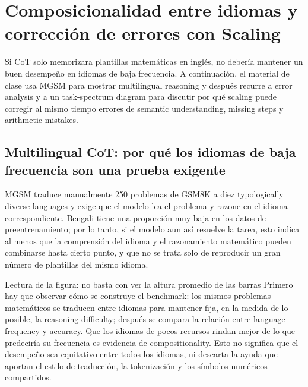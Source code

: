 \section{Composicionalidad entre idiomas y corrección de errores con Scaling}

Si CoT solo memorizara plantillas matemáticas en inglés, no debería mantener un buen desempeño en idiomas de baja frecuencia. A continuación, el material de clase usa MGSM para mostrar multilingual reasoning y después recurre a error analysis y a un task-spectrum diagram para discutir por qué scaling puede corregir al mismo tiempo errores de semantic understanding, missing steps y arithmetic mistakes.

\subsection{Multilingual CoT: por qué los idiomas de baja frecuencia son una prueba exigente}

MGSM traduce manualmente 250 problemas de GSM8K a diez typologically diverse languages y exige que el modelo lea el problema y razone en el idioma correspondiente. Bengali tiene una proporción muy baja en los datos de preentrenamiento; por lo tanto, si el modelo aun así resuelve la tarea, esto indica al menos que la comprensión del idioma y el razonamiento matemático pueden combinarse hasta cierto punto, y que no se trata solo de reproducir un gran número de plantillas del mismo idioma.


\begin{knowledgebox}{Lectura de la figura: no basta con ver la altura promedio de las barras}
Primero hay que observar cómo se construye el benchmark: los mismos problemas matemáticos se traducen entre idiomas para mantener fija, en la medida de lo posible, la reasoning difficulty; después se compara la relación entre language frequency y accuracy. Que los idiomas de pocos recursos rindan mejor de lo que predeciría su frecuencia es evidencia de compositionality. Esto no significa que el desempeño sea equitativo entre todos los idiomas, ni descarta la ayuda que aportan el estilo de traducción, la tokenización y los símbolos numéricos compartidos.
\end{knowledgebox}



